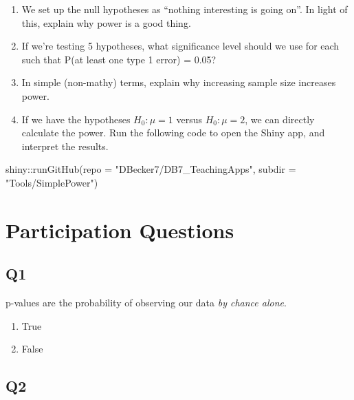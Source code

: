 \documentclass[
  letterpaper,
  DIV=11,
  numbers=noendperiod]{scrreprt}
\newenvironment{Shaded}{\begin{snugshade}}{\end{snugshade}}
\newcommand{\AttributeTok}[1]{\textcolor[rgb]{0.40,0.45,0.13}{#1}}
\newcommand{\FunctionTok}[1]{\textcolor[rgb]{0.28,0.35,0.67}{#1}}
\newcommand{\NormalTok}[1]{\textcolor[rgb]{0.00,0.23,0.31}{#1}}
\newcommand{\SpecialCharTok}[1]{\textcolor[rgb]{0.37,0.37,0.37}{#1}}
\newcommand{\StringTok}[1]{\textcolor[rgb]{0.13,0.47,0.30}{#1}}
\providecommand{\tightlist}{%
  \setlength{\itemsep}{0pt}\setlength{\parskip}{0pt}}\usepackage{longtable,booktabs,array}
\def\pspace{}
\begin{document}
\begin{enumerate}
\def\labelenumi{\arabic{enumi}.}
\tightlist
\item
  We set up the null hypotheses as ``nothing interesting is going on''.
  In light of this, explain why power is a good thing.
\item
  If we're testing 5 hypotheses, what significance level should we use
  for each such that P(at least one type 1 error) = 0.05?
\item
  In simple (non-mathy) terms, explain why increasing sample size
  increases power.
\item
  If we have the hypotheses \(H_0:\mu = 1\) versus \(H_0:\mu = 2\), we
  can directly calculate the power. Run the following code to open the
  Shiny app, and interpret the results.
\end{enumerate}

\begin{Shaded}
\begin{Highlighting}[]
\NormalTok{shiny}\SpecialCharTok{::}\FunctionTok{runGitHub}\NormalTok{(}\AttributeTok{repo =} \StringTok{"DBecker7/DB7\_TeachingApps"}\NormalTok{, }
    \AttributeTok{subdir =} \StringTok{"Tools/SimplePower"}\NormalTok{)}
\end{Highlighting}
\end{Shaded}

\hypertarget{participation-questions-2}{%
\section{Participation Questions}\label{participation-questions-2}}

\hypertarget{q1-1}{%
\subsection{Q1}\label{q1-1}}

p-values are the probability of observing our data \emph{by chance
alone}.

\pspace

\begin{enumerate}
\def\labelenumi{\arabic{enumi}.}
\tightlist
\item
  True
\item
  False
\end{enumerate}

\hypertarget{q2-1}{%
\subsection{Q2}\label{q2-1}}
\end{document}
